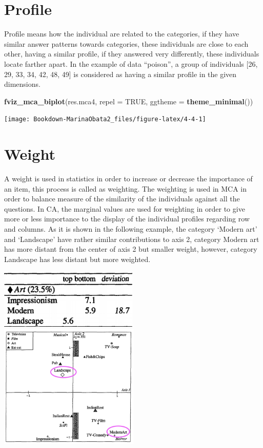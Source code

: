 \documentclass[]{book}
\newenvironment{Shaded}{\begin{snugshade}}{\end{snugshade}}
\newcommand{\DataTypeTok}[1]{\textcolor[rgb]{0.13,0.29,0.53}{#1}}
\newcommand{\KeywordTok}[1]{\textcolor[rgb]{0.13,0.29,0.53}{\textbf{#1}}}
\newcommand{\NormalTok}[1]{#1}
\newcommand{\OtherTok}[1]{\textcolor[rgb]{0.56,0.35,0.01}{#1}}
\begin{document}
\hypertarget{prouxfb01le}{%
\section{Proﬁle}\label{prouxfb01le}}

Profile means how the individual are related to the categories, if they have similar answer patterns towards categories, these individuals are close to each other, having a similar profile, if they answered very differently, these individuals locate farther apart.
In the example of data ``poison'', a group of individuals {[}26, 29, 33, 34, 42, 48, 49{]} is considered as having a similar profile in the given dimensions.

\begin{Shaded}
\begin{Highlighting}[]
\KeywordTok{fviz_mca_biplot}\NormalTok{(res.mca4, }
               \DataTypeTok{repel =} \OtherTok{TRUE}\NormalTok{,}
               \DataTypeTok{ggtheme =} \KeywordTok{theme_minimal}\NormalTok{())}
\end{Highlighting}
\end{Shaded}

\texttt{[image: Bookdown-MarinaObata2\_files/figure-latex/4-4-1]}

\hypertarget{weight}{%
\section{Weight}\label{weight}}

A weight is used in statistics in order to increase or decrease the importance of an item, this process is called as weighting. The weighting is used in MCA in order to balance measure of the similarity of the individuals against all the questions. In CA, the marginal values are used for weighting in order to give more or less importance to the display of the individual profiles regarding row and columns. As it is shown in the following example, the category `Modern art' and `Landscape' have rather similar contributions to axis 2, category Modern art has more distant from the center of axis 2 but smaller weight, however, category Landscape has less distant but more weighted.

\includegraphics[width=0.5\textwidth,height=\textheight]{table MCA.png}
\includegraphics[width=0.5\textwidth,height=\textheight]{graph MCA.png}
\end{document}
